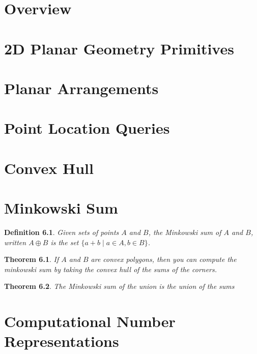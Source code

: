 \newtheorem{definition}{Definition}
\newtheorem{theorem}{Theorem}
\newtheorem{lemma}{Lemma}
\newtheorem{corollary}{Corollary}
\newtheorem{proposition}{Proposition}

\chapter{Overview}

\chapter{2D Planar Geometry Primitives}

\chapter{Planar Arrangements}

\chapter{Point Location Queries}

\chapter{Convex Hull}

\chapter{Minkowski Sum}

\begin{definition}
  \label{def:minkowski}
  Given sets of points $A$ and $B$, the Minkowski sum of $A$ and $B$, written
  $A ⊕ B$ is the set $\{a + b \mid a ∈ A, b ∈ B\}$.
\end{definition}

\begin{theorem}
  \label{thm:minkowski_convex_poly}
  \notready
  If $A$ and $B$ are convex polygons, then you can compute the minkowski sum by
  taking the convex hull of the sums of the corners.
\end{theorem}

\begin{theorem}
  \label{thm:minkowski_union}
  \notready
  The Minkowski sum of the union is the union of the sums
\end{theorem}

\chapter{Computational Number Representations}

